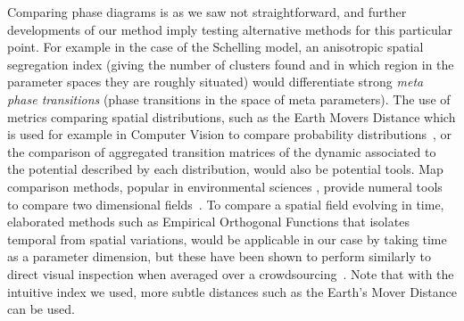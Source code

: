 \documentclass[Afour,sageh,times]{sagej}
\begin{document}
Comparing phase diagrams is as we saw not straightforward, and further developments of our method imply testing alternative methods for this particular point. For example in the case of the Schelling model, an anisotropic spatial segregation index (giving the number of clusters found and in which region in the parameter spaces they are roughly situated) would differentiate strong \emph{meta phase transitions} (phase transitions in the space of meta parameters). The use of metrics comparing spatial distributions, such as the Earth Movers Distance which is used for example in Computer Vision to compare probability distributions~\cite{rubner2000earth}, or the comparison of aggregated transition matrices of the dynamic associated to the potential described by each distribution, would also be potential tools. Map comparison methods, popular in environmental sciences , provide numeral tools to compare two dimensional fields~\cite{visser2006map}. To compare a spatial field evolving in time, elaborated methods such as Empirical Orthogonal Functions that isolates temporal from spatial variations, would be applicable in our case by taking time as a parameter dimension, but these have been shown to perform similarly to direct visual inspection when averaged over a crowdsourcing~\cite{10.1371/journal.pone.0178165}. Note that with the intuitive index we used, more subtle distances such as the Earth's Mover Distance can be used.




%
%
%
%
%
%
\end{document}
